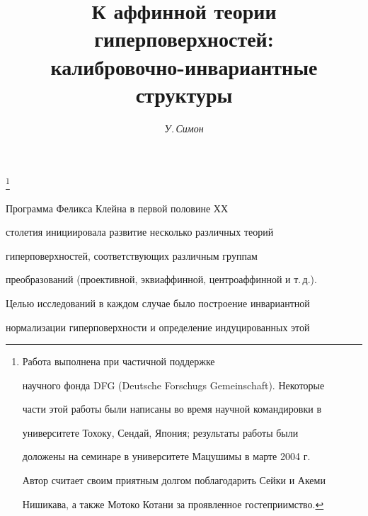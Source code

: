 




\author{\it У.\,Симон}




\title{К аффинной теории гиперповерхностей:\\


калибровочно-инвариантные структуры}


\thanks{Работа выполнена при частичной поддержке


научного фонда DFG (Deutsche Forschugs Gemeinschaft). Некоторые


части этой работы были написаны во время научной командировки в


университете Тохоку, Сендай, Япония; результаты работы были


доложены на семинаре в университете Мацушимы в марте 2004 г.


Автор считает своим приятным долгом поблагодарить Сейки и Акеми


Нишикава, а также Мотоко Котани за проявленное гостеприимство.}





\date{}




\pagestyle{plain} %







\maketitle


\label{begin}








Программа Феликса Клейна в первой половине ХХ


столетия инициировала развитие несколько различных теорий


гиперповерхностей, соответствующих различным группам


преобразований (проективной, эквиаффинной, центроаффинной и т.\,д.).


Целью исследований в каждом случае было построение инвариантной


нормализации гиперповерхности и определение индуцированных этой


